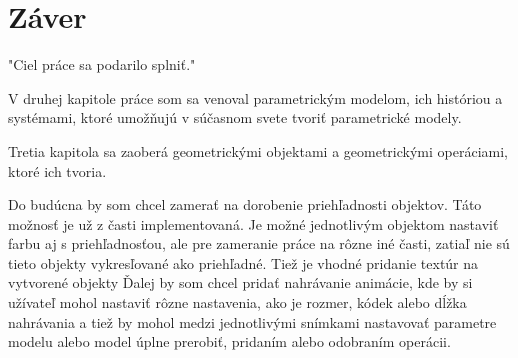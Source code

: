 




\chapter{Záver}
"Ciel práce sa podarilo splniť." 



V druhej kapitole práce som sa venoval parametrickým modelom, ich históriou a systémami, ktoré umožňujú v súčasnom svete tvoriť parametrické modely.

Tretia kapitola sa zaoberá geometrickými objektami a geometrickými operáciami, ktoré ich tvoria.








Do budúcna by som chcel zamerať na dorobenie priehľadnosti objektov. Táto možnosť je už z časti implementovaná. Je možné jednotlivým objektom nastaviť farbu aj s priehľadnosťou, ale pre zameranie práce na rôzne iné časti, zatiaľ nie sú tieto objekty vykresľované ako priehľadné.
Tiež je vhodné pridanie textúr na vytvorené objekty 
Ďalej by som chcel pridať nahrávanie animácie, kde by si užívateľ mohol nastaviť rôzne nastavenia, ako je rozmer, kódek alebo dĺžka nahrávania a tiež by mohol medzi jednotlivými snímkami nastavovať parametre modelu alebo model úplne prerobiť, pridaním alebo odobraním operácii.  


